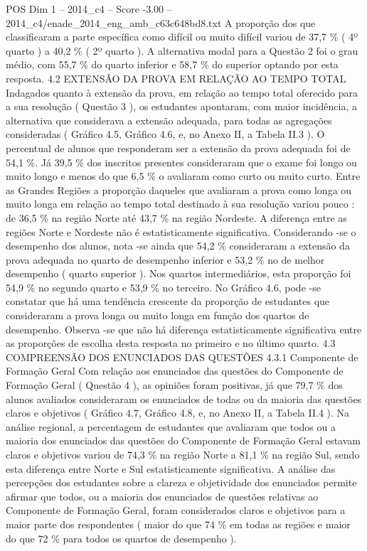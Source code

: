 \begin{textsample}{POS Dim 1 – 2014\_c4 – Score -3.00 – 2014\_c4/enade\_2014\_eng\_amb\_c63c648bd8.txt}
A proporção dos que classificaram a parte específica como difícil ou muito difícil variou de 37,7 \% ( 4º quarto ) a 40,2 \% ( 2º quarto ).
A alternativa modal para a Questão 2 foi o grau médio, com 55,7 \% do quarto inferior e 58,7 \% do superior optando por esta resposta. 4.2 EXTENSÃO DA PROVA EM RELAÇÃO AO TEMPO TOTAL Indagados quanto à extensão da prova, em relação ao tempo total oferecido para a sua resolução ( Questão 3 ), os estudantes apontaram, com maior incidência, a alternativa que considerava a extensão adequada, para todas as agregações consideradas ( Gráfico 4.5, Gráfico 4.6, e, no Anexo II, a Tabela II.3 ).
O percentual de alunos que responderam ser a extensão da prova adequada foi de 54,1 \%.
Já 39,5 \% dos inscritos presentes consideraram que o exame foi longo ou muito longo e menos do que 6,5 \% o avaliaram como curto ou muito curto.
Entre as Grandes Regiões a proporção daqueles que avaliaram a prova como longa ou muito longa em relação ao tempo total destinado à sua resolução variou pouco : de 36,5 \% na região Norte até 43,7 \% na região Nordeste.
A diferença entre as regiões Norte e Nordeste não é estatisticamente significativa.
Considerando -se o desempenho dos alunos, nota -se ainda que 54,2 \% consideraram a extensão da prova adequada no quarto de desempenho inferior e 53,2 \% no de melhor desempenho ( quarto superior ).
Nos quartos intermediários, esta proporção foi 54,9 \% no segundo quarto e 53,9 \% no terceiro.
No Gráfico 4.6, pode -se constatar que há uma tendência crescente da proporção de estudantes que consideraram a prova longa ou muito longa em função dos quartos de desempenho.
Observa -se que não há diferença estatisticamente significativa entre as proporções de escolha desta resposta no primeiro e no último quarto. 4.3 COMPREENSÃO DOS ENUNCIADOS DAS QUESTÕES 4.3.1 Componente de Formação Geral Com relação aos enunciados das questões do Componente de Formação Geral ( Questão 4 ), as opiniões foram positivas, já que 79,7 \% dos alunos avaliados consideraram os enunciados de todas ou da maioria das questões claros e objetivos ( Gráfico 4.7, Gráfico 4.8, e, no Anexo II, a Tabela II.4 ).
Na análise regional, a percentagem de estudantes que avaliaram que todos ou a maioria dos enunciados das questões do Componente de Formação Geral estavam claros e objetivos variou de 74,3 \% na região Norte a 81,1 \% na região Sul, sendo esta diferença entre Norte e Sul estatisticamente significativa.
A análise das percepções dos estudantes sobre a clareza e objetividade dos enunciados permite afirmar que todos, ou a maioria dos enunciados de questões relativas ao Componente de Formação Geral, foram considerados claros e objetivos para a maior parte dos respondentes ( maior do que 74 \% em todas as regiões e maior do que 72 \% para todos os quartos de desempenho ).

\end{textsample}
